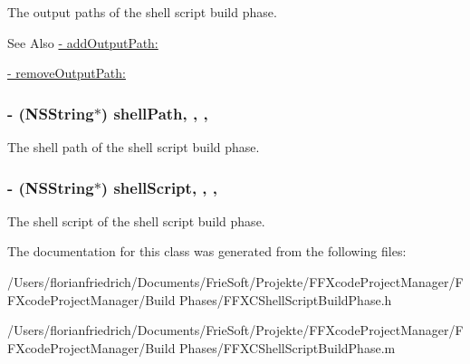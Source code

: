 The output paths of the shell script build phase. \begin{DoxySeeAlso}{See Also}
\hyperlink{interface_f_f_x_c_shell_script_build_phase_a626f9283fe4715817df202318e800a4f}{-\/ add\-Output\-Path\-:} 

\hyperlink{interface_f_f_x_c_shell_script_build_phase_a1bed9b557cefb031978aa361fccb9c21}{-\/ remove\-Output\-Path\-:} 
\end{DoxySeeAlso}
\hypertarget{interface_f_f_x_c_shell_script_build_phase_ad51964bbebad3c7f267ad3b74d2cca38}{
\subsubsection[{shell\-Path}]{\setlength{\rightskip}{0pt plus 5cm}-\/ (N\-S\-String$\ast$) shell\-Path\hspace{0.3cm}{\ttfamily [read]}, {\ttfamily [write]}, {\ttfamily [nonatomic]}, {\ttfamily [strong]}}}\label{interface_f_f_x_c_shell_script_build_phase_ad51964bbebad3c7f267ad3b74d2cca38}
The shell path of the shell script build phase. \hypertarget{interface_f_f_x_c_shell_script_build_phase_aa297d31181345a1cc3c37a51a9297db7}{
\subsubsection[{shell\-Script}]{\setlength{\rightskip}{0pt plus 5cm}-\/ (N\-S\-String$\ast$) shell\-Script\hspace{0.3cm}{\ttfamily [read]}, {\ttfamily [write]}, {\ttfamily [nonatomic]}, {\ttfamily [strong]}}}\label{interface_f_f_x_c_shell_script_build_phase_aa297d31181345a1cc3c37a51a9297db7}
The shell script of the shell script build phase. 

The documentation for this class was generated from the following files\-:\begin{DoxyCompactItemize}
\item 
/\-Users/florianfriedrich/\-Documents/\-Frie\-Soft/\-Projekte/\-F\-F\-Xcode\-Project\-Manager/\-F\-F\-Xcode\-Project\-Manager/\-Build Phases/F\-F\-X\-C\-Shell\-Script\-Build\-Phase.\-h\item 
/\-Users/florianfriedrich/\-Documents/\-Frie\-Soft/\-Projekte/\-F\-F\-Xcode\-Project\-Manager/\-F\-F\-Xcode\-Project\-Manager/\-Build Phases/F\-F\-X\-C\-Shell\-Script\-Build\-Phase.\-m\end{DoxyCompactItemize}
